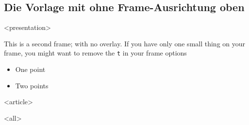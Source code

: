 \subsection{Die Vorlage mit ohne Frame-Ausrichtung oben}
{%
\begin{frame}[fragile]




\mode
<presentation>

	This is a second frame; with no overlay.
	If you have only one small thing on your frame, you might want to remove the \texttt{t} in your frame options

	\begin{itemize}
		\item One point
		\item Two points
	\end{itemize}

\mode
<article>

\mode
<all>

\end{frame}
}

\newpage
